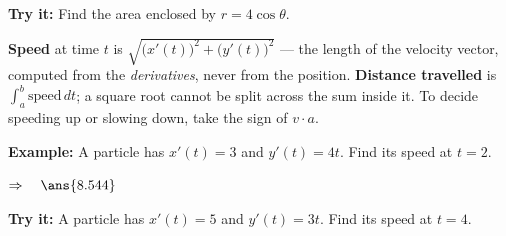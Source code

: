 \documentclass[12pt]{article}
\begin{document}
\begin{tryitbox}
\textbf{Try it:} \quad Find the area enclosed by $r = 4\cos\theta$.\\[2pt]
\end{tryitbox}


\begin{formulabox}
\textbf{Speed} at time $t$ is $\sqrt{\big(x'(t)\big)^2 + \big(y'(t)\big)^2}$ --- the length of the velocity vector, computed from the \emph{derivatives}, never from the position. \textbf{Distance travelled} is $\int_a^b \text{speed}\,dt$; a square root cannot be split across the sum inside it. To decide speeding up or slowing down, take the sign of $v \cdot a$.
\end{formulabox}

\begin{examplebox}
\textbf{Example:} \quad A particle has $x'(t) = 3$ and $y'(t) = 4t$. Find its speed at $t = 2$.

$\Rightarrow\quad \ans{8.544}$
\end{examplebox}

\begin{tryitbox}
\textbf{Try it:} \quad A particle has $x'(t) = 5$ and $y'(t) = 3t$. Find its speed at $t = 4$.\\[2pt]
\end{tryitbox}
\end{document}
